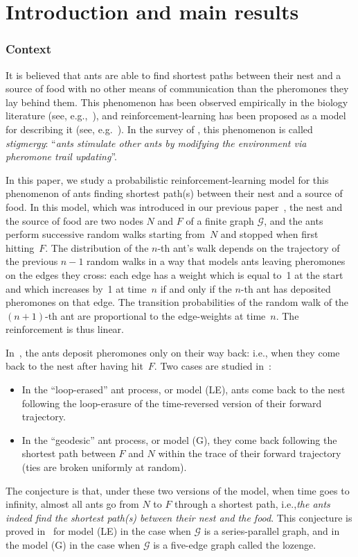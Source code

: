 \documentclass[11pt]{article}
\newcommand{\ie}{i.e.,\xspace}
\let\mathcal\mathscr
\numberwithin{equation}{section}
\theoremstyle{definition}
\begin{document}
\section{Introduction and main results}
\subsubsection*{Context}
It is believed that ants are able to find shortest paths between their nest and a source of food
with no other means of communication than the pheromones they lay behind them.
This phenomenon has been observed empirically in the biology literature
(see, e.g.,~\cite{ants_89, Deneu90, current_ants}), and reinforcement-learning has been proposed as a model for {describing it} (see, e.g.~\cite{current_ants}).
In the survey of \cite[Ch.\,1]{book_ant}, this phenomenon is called \emph{stigmergy}: ``\emph{ants stimulate other ants by modifying the environment via pheromone trail updating}''.

In this paper, we study a probabilistic reinforcement-learning model
for this phenomenon of ants finding shortest path(s) between their nest and a source of food.
In this model, which was introduced in our previous paper~\cite{KMS},
the nest and the source of food are two nodes $N$ and $F$ of a finite graph $\mathcal G$,
and the ants perform successive random walks starting from~$N$ and stopped when first hitting~$F$.
The distribution of the $n$-th ant's walk depends on the trajectory of the previous $n-1$ random walks in a way that models ants leaving pheromones on the edges they cross:
each edge has a weight which is equal to~{1} at the start and which increases by~1
at time~$n$ if and only if the $n$-th ant has deposited pheromones on that edge.
The transition probabilities of the random walk of the $(n+1)$-th ant are proportional to the edge-weights at time~$n$.
The reinforcement is thus linear.

In~\cite{KMS}, the ants deposit pheromones only on their way back:
\ie when they come back to the nest after having hit~$F$.
Two cases are studied in~\cite{KMS}:
\begin{itemize}
\item In the ``loop-erased'' ant process, or model (LE), ants come back to the nest following the loop-erasure of the time-reversed version of their forward trajectory.
\item In the ``geodesic'' ant process, or model (G), they come back following the shortest path between $F$ and $N$ within the trace of their forward trajectory (ties are broken uniformly at random).
\end{itemize}
The conjecture is that, under these two versions of the model, when time goes to infinity, almost all ants go from $N$ to $F$ through a shortest path, \ie \emph{the ants indeed find the shortest path(s) between their nest and the food}.
This conjecture is proved in~\cite{KMS} for model (LE) in the case when $\mathcal G$ is a series-parallel graph, and in the model (G) in the case when $\mathcal G$ is a five-edge graph called the lozenge.
\end{document}
